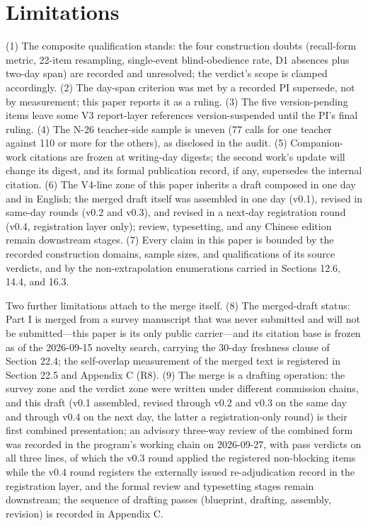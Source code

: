 \documentclass[11pt]{article}
\begin{document}
\section{Limitations}
\label{sec:21}
\noindent (1) The composite qualification stands: the four construction doubts (recall-form metric, 22-item resampling, single-event blind-obedience rate, D1 absences plus two-day span) are recorded and unresolved; the verdict's scope is clamped accordingly. (2) The day-span criterion was met by a recorded PI supersede, not by measurement; this paper reports it as a ruling. (3) The five version-pending items leave some V3 report-layer references version-suspended until the PI's final ruling. (4) The N-26 teacher-side sample is uneven (77 calls for one teacher against 110 or more for the others), as disclosed in the audit. (5) Companion-work citations are frozen at writing-day digests; the second work's update will change its digest, and its formal publication record, if any, supersedes the internal citation. (6) The V4-line zone of this paper inherits a draft composed in one day and in English; the merged draft itself was assembled in one day (v0.1), revised in same-day rounds (v0.2 and v0.3), and revised in a next-day registration round (v0.4, registration layer only); review, typesetting, and any Chinese edition remain downstream stages. (7) Every claim in this paper is bounded by the recorded construction domains, sample sizes, and qualifications of its source verdicts, and by the non-extrapolation enumerations carried in Sections 12.6, 14.4, and 16.3.\par
\noindent Two further limitations attach to the merge itself. (8) The merged-draft status: Part I is merged from a survey manuscript that was never submitted and will not be submitted—this paper is its only public carrier—and its citation base is frozen as of the 2026-09-15 novelty search, carrying the 30-day freshness clause of Section 22.4; the self-overlap measurement of the merged text is registered in Section 22.5 and Appendix C (R8). (9) The merge is a drafting operation: the survey zone and the verdict zone were written under different commission chains, and this draft (v0.1 assembled, revised through v0.2 and v0.3 on the same day and through v0.4 on the next day, the latter a registration-only round) is their first combined presentation; an advisory three-way review of the combined form was recorded in the program's working chain on 2026-09-27, with pass verdicts on all three lines, of which the v0.3 round applied the registered non-blocking items while the v0.4 round registers the externally issued re-adjudication record in the registration layer, and the formal review and typesetting stages remain downstream; the sequence of drafting passes (blueprint, drafting, assembly, revision) is recorded in Appendix C.\par
\end{document}
